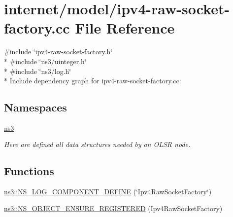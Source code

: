 \hypertarget{ipv4-raw-socket-factory_8cc}{}\section{internet/model/ipv4-\/raw-\/socket-\/factory.cc File Reference}
\label{ipv4-raw-socket-factory_8cc}
{\ttfamily \#include \char`\"{}ipv4-\/raw-\/socket-\/factory.\+h\char`\"{}}\\*
{\ttfamily \#include \char`\"{}ns3/uinteger.\+h\char`\"{}}\\*
{\ttfamily \#include \char`\"{}ns3/log.\+h\char`\"{}}\\*
Include dependency graph for ipv4-\/raw-\/socket-\/factory.cc\+:
\subsection*{Namespaces}
\begin{DoxyCompactItemize}
\item 
 \hyperlink{namespacens3}{ns3}
\begin{DoxyCompactList}\small\item\em Here are defined all data structures needed by an O\+L\+SR node. \end{DoxyCompactList}\end{DoxyCompactItemize}
\subsection*{Functions}
\begin{DoxyCompactItemize}
\item 
\hyperlink{namespacens3_ac4507bfdc4dd9d60fd5db54738cbceeb}{ns3\+::\+N\+S\+\_\+\+L\+O\+G\+\_\+\+C\+O\+M\+P\+O\+N\+E\+N\+T\+\_\+\+D\+E\+F\+I\+NE} (\char`\"{}Ipv4\+Raw\+Socket\+Factory\char`\"{})
\item 
\hyperlink{namespacens3_ac3b35f065a64c6d0f341139a2adaa93e}{ns3\+::\+N\+S\+\_\+\+O\+B\+J\+E\+C\+T\+\_\+\+E\+N\+S\+U\+R\+E\+\_\+\+R\+E\+G\+I\+S\+T\+E\+R\+ED} (Ipv4\+Raw\+Socket\+Factory)
\end{DoxyCompactItemize}
